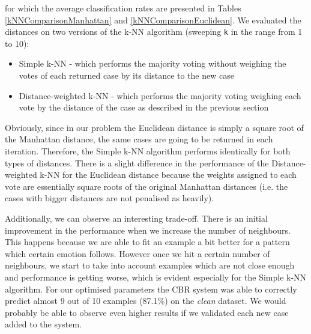 \documentclass[a4paper]{article}
\begin{document}
for which the average classification rates are presented in Tables \ref{kNNComparisonManhattan} and \ref{kNNComparisonEuclidean}. We evaluated the distances on two versions of the k-NN algorithm (sweeping \texttt{k} in the range from 1 to 10):
\begin{itemize}
\item Simple k-NN - which performs the majority voting without weighing the votes of each returned case by its distance to the new case
\item Distance-weighted k-NN - which performs the majority voting weighing each vote by the distance of the case as described in the previous section
\end{itemize}

Obviously, since in our problem the Euclidean distance is simply a square root of the Manhattan distance, the same cases are going to be returned in each iteration. Therefore, the Simple k-NN algorithm performs identically for both types of distances. There is a slight difference in the performance of the Distance-weighted k-NN for the Euclidean distance because the weights assigned to each vote are essentially square roots of the original Manhattan distances (i.e. the cases with bigger distances are not penalised as heavily).

Additionally, we can observe an interesting trade-off. There is an initial improvement in the performance when we increase the number of neighbours. This happens because we are able to fit an example a bit better for a pattern which certain emotion follows. However once we hit a certain number of neighbours, we start to take into account examples which are not close enough and performance is getting worse, which is evident especially for the Simple k-NN algorithm. For our optimised parameters the CBR system was able to correctly predict almost 9 out of 10 examples (87.1\%) on the \emph{clean} dataset. We would probably be able to observe even higher results if we validated each new case added to the system.
\end{document}
